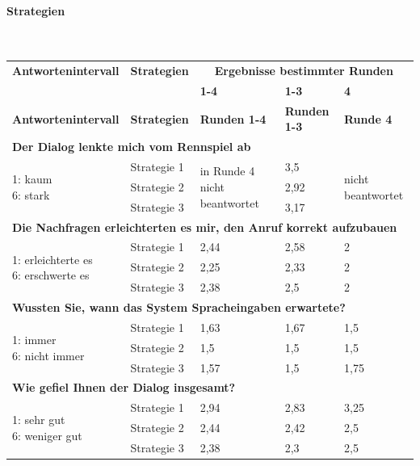 \documentclass[12pt,a4paper]{scrartcl}
\begin{document}
\paragraph{Strategien}
~\\
\begin{longtable}{|p{4cm}|p{2cm}|p{2cm}|p{2cm}|p{2cm}|}
	\hline
		\textbf{Antwortenintervall}&\textbf{Strategien}&\multicolumn{3}{c|}{\textbf{Ergebnisse bestimmter Runden}}\\
	&&\textbf{1-4}&\textbf{1-3} &\textbf{4}\\
	\hline
	\endfirsthead
	\hline
	\textbf{Antwortenintervall}&\textbf{Strategien}&\textbf{Runden 1-4}&\textbf{Runden 1-3} &\textbf{Runde 4}\\
	\hline
	\endhead
		\multicolumn{5}{l}{\textbf{Der Dialog lenkte mich vom Rennspiel ab}}\\
		\hline
\multirow{3}{4cm}{1: kaum \newline 6: stark} & Strategie 1 & \multirow{3}{2,5cm}{in Runde 4 nicht beantwortet} & 3,5  & \multirow{3}{2,5cm}{nicht beantwortet} \\
 & Strategie 2 & & 2,92 & \\
 & Strategie 3 & & 3,17 & \\
\hline
		\multicolumn{5}{l}{\textbf{Die Nachfragen erleichterten es mir, den Anruf korrekt aufzubauen}}\\
		\hline
\multirow{3}{4cm}{1: erleichterte es\newline  6: erschwerte es} & Strategie 1 & 2,44 & 2,58 & 2 \\
 & Strategie 2 & 2,25 & 2,33 & 2 \\
 & Strategie 3 & 2,38 & 2,5 & 2 \\
\hline
		\multicolumn{5}{l}{\textbf{Wussten Sie, wann das System Spracheingaben erwartete?}}\\
		\hline
\multirow{3}{4cm}{1: immer \newline  6: nicht immer} & Strategie 1 & 1,63 & 1,67 & 1,5 \\
 & Strategie 2 & 1,5 & 1,5 & 1,5 \\
 & Strategie 3 & 1,57 & 1,5 & 1,75 \\
\hline
		\multicolumn{5}{l}{\textbf{Wie gefiel Ihnen der Dialog insgesamt?}}\\
		\hline
\multirow{3}{4cm}{1: sehr gut \newline  6: weniger gut} & Strategie 1 & 2,94 & 2,83 & 3,25 \\
 & Strategie 2 & 2,44 & 2,42 & 2,5 \\
 & Strategie 3 & 2,38 & 2,3 & 2,5 \\

\end{longtable}
\end{document}
